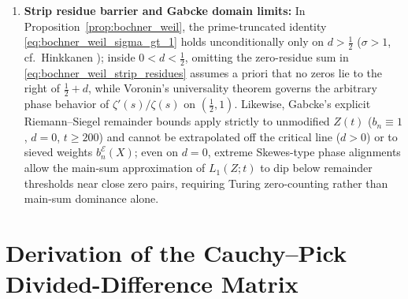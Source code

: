 \documentclass[11pt,reqno]{amsart}
\theoremstyle{definition}
\theoremstyle{remark}
\numberwithin{equation}{section}
\newcommand{\ii}{\mathrm{i}}
\newcommand{\sinch}{\operatorname{sinc}_{\mathrm{hyp}}}
\begin{document}
\begin{enumerate}[label=\textup{(\arabic*)},leftmargin=2.2em]
\begin{equation}
    = -2\bigl\lvert\mathcal{M}_X^{\mathrm{sym}}(t-\ii d)\bigr\rvert^2 \sum_{2 \le n \le X}\frac{\Lambda(n)\ln n}{\sqrt{n}}\,\sinch(d\ln n)\cos(t\ln n).
  \end{equation}
  However, two simultaneous obstructions arise: first, $E_X(s) \neq E_X(1-s)$ breaks the functional equation of $\xi(s)$, so neither $E_X(s)\xi(s)$ nor $\mathcal{M}_X^{\mathrm{sym}}(z)\Xi(z)$ admits a symmetric Riemann--Siegel main sum with coefficients $b_n^{\mathcal{E}}(X)$; second, by Kronecker's linear independence of $\{\ln p\}$, \eqref{eq:W_1Msym_explicit} has mean zero in $t$ and oscillates between positive and negative values, subtracting from $\lvert\mathcal{M}_X^{\mathrm{sym}}\rvert^2\widetilde{W}(d,t)$ in \eqref{eq:W_M_unscaled} whenever primes align in phase.
  \item \textbf{Strip residue barrier and Gabcke domain limits:} In Proposition~\ref{prop:bochner_weil}, the prime-truncated identity \eqref{eq:bochner_weil_sigma_gt_1} holds unconditionally only on $d > \frac{1}{2}$ ($\sigma > 1$, cf.\ Hinkkanen \cite{Hinkkanen1997}); inside $0 < d < \frac{1}{2}$, omitting the zero-residue sum in \eqref{eq:bochner_weil_strip_residues} assumes a priori that no zeros lie to the right of $\frac{1}{2}+d$, while Voronin's universality theorem \cite{Voronin1975} governs the arbitrary phase behavior of $\zeta'(s)/\zeta(s)$ on $(\frac{1}{2}, 1)$. Likewise, Gabcke's explicit Riemann--Siegel remainder bounds \cite{Gabcke1979} apply strictly to unmodified $Z(t)$ ($b_n \equiv 1$, $d = 0$, $t \ge 200$) and cannot be extrapolated off the critical line ($d > 0$) or to sieved weights $b_n^{\mathcal{E}}(X)$; even on $d = 0$, extreme Skewes-type phase alignments allow the main-sum approximation of $L_1(Z; t)$ to dip below remainder thresholds near close zero pairs, requiring Turing zero-counting \cite{Turing1953,PlattTrudgian2021} rather than main-sum dominance alone.
\end{enumerate}

\appendix

\section{Derivation of the Cauchy--Pick Divided-Difference Matrix}\label{app:cauchy_pick}
\end{document}
